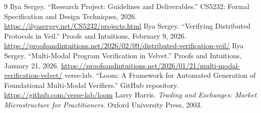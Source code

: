 \begin{thebibliography}{9}
 Ilya Sergey. ``Research Project: Guidelines and Deliverables.'' CS5232: Formal Specification and Design Techniques, 2026. \url{https://ilyasergey.net/CS5232/projects.html}
 Ilya Sergey. ``Verifying Distributed Protocols in Veil.'' Proofs and Intuitions, February 9, 2026. \url{https://proofsandintuitions.net/2026/02/09/distributed-verification-veil/}
 Ilya Sergey. ``Multi-Modal Program Verification in Velvet.'' Proofs and Intuitions, January 21, 2026. \url{https://proofsandintuitions.net/2026/01/21/multi-modal-verification-velvet/}
 verse-lab. ``Loom: A Framework for Automated Generation of Foundational Multi-Modal Verifiers.'' GitHub repository. \url{https://github.com/verse-lab/loom}
 Larry Harris. \emph{Trading and Exchanges: Market Microstructure for Practitioners}. Oxford University Press, 2003.
\end{thebibliography}
